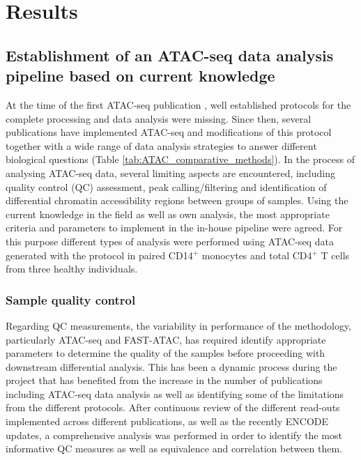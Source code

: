 \section{Results}
%

\subsection{Establishment of an ATAC-seq data analysis pipeline based on current knowledge}
At the time of the first ATAC-seq publication \parencite{Buenrostro2013}, well established protocols for the complete processing and data analysis were missing. Since then, several publications have implemented ATAC-seq and modifications of this protocol together with a wide range of data analysis strategies to answer different biological questions (Table \ref{tab:ATAC_comparative_methods}).
In the process of analysing ATAC-seq data, several limiting aspects are encountered, including quality control (QC) assessment, peak calling/filtering and identification of differential chromatin accessibility regions between groups of samples. Using the current knowledge in the field as well as own analysis, the most appropriate criteria and parameters to implement in the in-house pipeline were agreed. For this purpose different types of analysis were performed using ATAC-seq data generated with the \parencite{Buenrostro2013} protocol in paired CD14$^+$ monocytes and total CD4$^+$ T cells from three healthy individuals. 


\subsubsection{Sample quality control}
Regarding QC measurements, the variability in performance of the methodology, particularly ATAC-seq and FAST-ATAC, has required identify appropriate parameters to determine the quality of the samples before proceeding with downstream differential analysis. This has been a dynamic process during the project that has benefited from the increase in the number of publications including ATAC-seq data analysis as well as identifying some of the limitations from the different protocols. After continuous review of the different read-outs implemented across different publications, as well as the recently ENCODE updates, a comprehensive analysis was performed in order to identify the most informative QC measures as well as equivalence and correlation between them.

